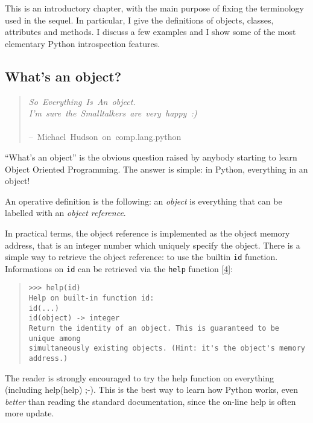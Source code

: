 \documentclass[10pt,english]{article}
\begin{document}
This is an introductory chapter, with the main purpose of fixing the 
terminology used in the sequel. In particular, I give the definitions 
of objects, classes, attributes and methods. I discuss a few examples 
and I show some of the most elementary Python introspection features.



\hypertarget{what-s-an-object}{}
\subsection*{What's an object?}
\begin{quote}
\begin{flushleft}
\emph{So~Everything~Is~An~object.~~~\\
I'm~sure~the~Smalltalkers~are~very~happy~:)}~\\
~\\
--~Michael~Hudson~on~comp.lang.python
\end{flushleft}
\end{quote}

``What's an object'' is the obvious question raised by anybody starting 
to learn Object Oriented Programming. The answer is simple: in Python, 
everything in an object!

An operative definition is the following: an \emph{object}
is everything that can be labelled with an \emph{object reference}.

In practical terms, the object reference is implemented as 
the object memory address, that is an integer number which uniquely
specify the object. There is a simple way to retrieve the object reference:
to use the builtin \texttt{id} function. Informations on \texttt{id} can be retrieved 
via the \texttt{help} function [\hyperlink{id7}{4}]:
\begin{quote}
\begin{verbatim}>>> help(id)
Help on built-in function id:
id(...)
id(object) -> integer
Return the identity of an object. This is guaranteed to be unique among
simultaneously existing objects. (Hint: it's the object's memory address.)\end{verbatim}
\end{quote}

The reader is strongly encouraged to try the help function on everything
(including help(help) ;-). This is the best way to learn how Python works,
even \emph{better} than reading the standard documentation, since the on-line
help is often more update.
\end{document}

